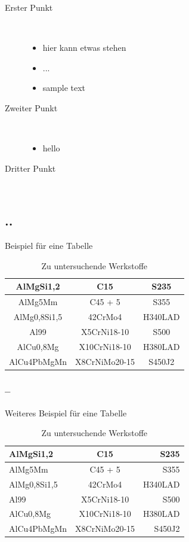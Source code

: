 \documentclass[a4paper, 12pt]{article}
\begin{document}
\begin{description}
  \item[Erster Punkt]~\par
  \begin{itemize}
     \item hier kann etwas stehen
     \item ...
     \item sample text
  \end{itemize}
  \item[Zweiter Punkt]~\par
  \begin{itemize}
      \item hello
  \end{itemize}
  \item[Dritter Punkt]~\par
\end{description}

\subsection{..}
Beispiel für eine Tabelle

\bgroup
\def\arraystretch{1.5}
\begin{table}[!ht]
    \large
    \centering
    \begin{tabular}{|c|c|c|}
    \hline
    AlMgSi1,2 & C15 & S235 \\
    \hline 
    AlMg5Mm & C45 + 5 & S355 \\
    \hline
    AlMg0,8Si1,5 & 42CrMo4 & H340LAD \\
    \hline
    Al99 & X5CrNi18-10 & S500 \\
    \hline
    AlCu0,8Mg & X10CrNi18-10 & H380LAD \\
    \hline
    AlCu4PbMgMn & X8CrNiMo20-15 & S450J2\\
    \hline
    \end{tabular}
    \caption{Zu untersuchende Werkstoffe}
    \label{tab:tabelle1}
\end{table}
\egroup

\newpage
\subsubsection{--}
Weiteres Beispiel für eine Tabelle

\bgroup
\def\arraystretch{1.5}
\begin{table}[!ht]
    \small
    \centering
    \begin{tabular}{l|c|r}
    AlMgSi1,2 & C15 & S235 \\
    \hline 
    AlMg5Mm & C45 + 5 & S355 \\
    \hline
    AlMg0,8Si1,5 & 42CrMo4 & H340LAD \\
    \hline
    Al99 & X5CrNi18-10 & S500 \\
    \hline
    AlCu0,8Mg & X10CrNi18-10 & H380LAD \\
    \hline
    AlCu4PbMgMn & X8CrNiMo20-15 & S450J2\\
    \end{tabular}
    \caption{Zu untersuchende Werkstoffe}
    \label{tab:tabelle2}
\end{table}
\egroup
\FloatBarrier
\end{document}
